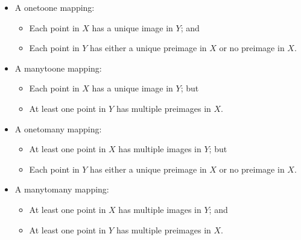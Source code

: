 \documentclass[letterpaper,10pt,english]{jupyterBook}
\begin{document}
\begin{itemize}
\item {} 
\sphinxAtStartPar
A one\sphinxhyphen{}to\sphinxhyphen{}one mapping:
\begin{itemize}
\item {} 
\sphinxAtStartPar
Each point in \(X\) has a unique image in \(Y\); and

\item {} 
\sphinxAtStartPar
Each point in \(Y\) has either a unique pre\sphinxhyphen{}image in \(X\) or no pre\sphinxhyphen{}image in \(X\).

\end{itemize}

\item {} 
\sphinxAtStartPar
A many\sphinxhyphen{}to\sphinxhyphen{}one mapping:
\begin{itemize}
\item {} 
\sphinxAtStartPar
Each point in \(X\) has a unique image in \(Y\); but

\item {} 
\sphinxAtStartPar
At least one point in \(Y\) has multiple pre\sphinxhyphen{}images in \(X\).

\end{itemize}

\item {} 
\sphinxAtStartPar
A one\sphinxhyphen{}to\sphinxhyphen{}many mapping:
\begin{itemize}
\item {} 
\sphinxAtStartPar
At least one point in \(X\) has multiple images in \(Y\); but

\item {} 
\sphinxAtStartPar
Each point in \(Y\) has either a unique pre\sphinxhyphen{}image in \(X\) or no pre\sphinxhyphen{}image in \(X\).

\end{itemize}

\item {} 
\sphinxAtStartPar
A many\sphinxhyphen{}to\sphinxhyphen{}many mapping:
\begin{itemize}
\item {} 
\sphinxAtStartPar
At least one point in \(X\) has multiple images in \(Y\); and

\item {} 
\sphinxAtStartPar
At least one point in \(Y\) has multiple pre\sphinxhyphen{}images in \(X\).

\end{itemize}

\end{itemize}
\end{document}
